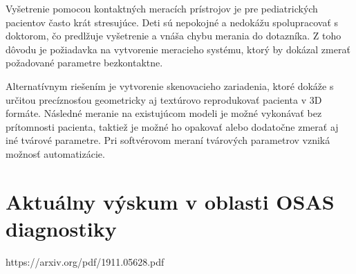 Vyšetrenie pomocou kontaktných meracích prístrojov je pre pediatrických pacientov často krát
stresujúce. Deti sú nepokojné a nedokážu spolupracovať s doktorom, čo predlžuje vyšetrenie a
vnáša chybu merania do dotazníka. Z toho dôvodu je požiadavka na vytvorenie meracieho
systému, ktorý by dokázal zmerať požadované parametre bezkontaktne.

Alternatívnym riešením je vytvorenie skenovacieho zariadenia, ktoré dokáže s určitou
precíznosťou geometricky aj textúrovo reprodukovať pacienta v 3D formáte. Následné meranie
na existujúcom modeli je možné vykonávať bez prítomnosti pacienta, taktiež je možné ho
opakovať alebo dodatočne zmerať aj iné tvárové parametre. Pri softvérovom meraní tvárových
parametrov vzniká možnosť automatizácie.

\section{Aktuálny výskum v oblasti OSAS diagnostiky}

https://arxiv.org/pdf/1911.05628.pdf